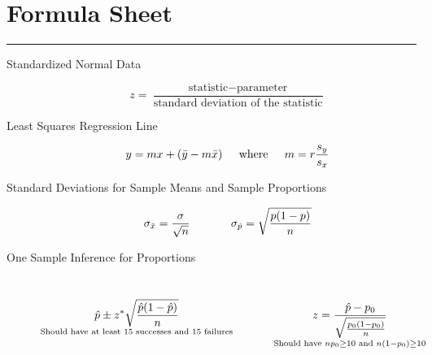 \documentclass[11pt]{article}
\begin{document}
\pagestyle{empty}
\section*{Formula Sheet} %
\hrule

\noindent

\begin{description}

\item[Standardized Normal Data]
$$z = \frac{\text{statistic} - \text{parameter}}{\text{standard deviation of the statistic}}$$

\item[Least Squares Regression Line] 
$$y = m x + (\bar{y}-m\bar{x})  \hspace*{0.2in} \text{where} \hspace*{0.2in}  m = r \frac{s_y}{s_x}   $$  




\item[Standard Deviations for Sample Means and Sample Proportions] 
$$\sigma_{\bar{x}} = \frac{\sigma}{\sqrt{n}} \hspace*{0.5in} \sigma_{\hat{p}} = \sqrt{\frac{p(1-p)}{n} }$$


\item[One Sample Inference for Proportions] ~ %
$$\underset{\text{Should have at least 15 successes and 15 failures}}{\displaystyle \hat{p} \pm z^* \sqrt{\frac{\hat{p}(1-\hat{p})}{n}}}  \hspace*{0.5in} \underset{\text{Should have } np_0 \ge 10 \text{ and } n(1-p_0) \ge 10}{z = \frac{\hat{p}-p_0}{\sqrt{\frac{p_0(1-p_0)}{n}}}}$$



\end{description}
\end{document}
